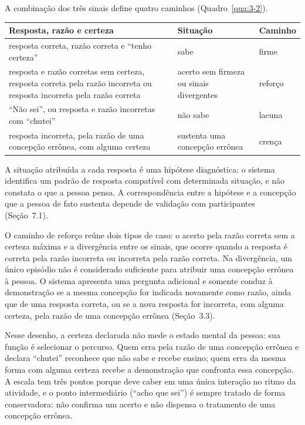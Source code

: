 A combinação dos três sinais define quatro caminhos (Quadro~\ref{qua:3-2}).

\begin{quadro}[htbp]
\caption{Classificação da resposta e caminho correspondente}\label{qua:3-2}
\footnotesize
\begin{tabularx}{\textwidth}{|X|X|>{\centering\arraybackslash}p{1.9cm}|}
\hline
\textbf{Resposta, razão e certeza} & \textbf{Situação} & \textbf{Caminho} \\ \hline
resposta correta, razão correta e ``tenho certeza'' & sabe & firme \\ \hline
resposta e razão corretas sem certeza, resposta correta pela razão incorreta ou resposta incorreta pela razão correta & acerto sem firmeza ou sinais divergentes & reforço \\ \hline
``Não sei'', ou resposta e razão incorretas com ``chutei'' & não sabe & lacuna \\ \hline
resposta incorreta, pela razão de uma concepção errônea, com alguma certeza & sustenta uma concepção errônea & crença \\ \hline
\end{tabularx}
\end{quadro}

A situação atribuída a cada resposta é uma hipótese diagnóstica: o sistema identifica um padrão de resposta compatível com determinada situação, e não constata o que a pessoa pensa. A correspondência entre a hipótese e a concepção que a pessoa de fato sustenta depende de validação com participantes (Seção~7.1).

O caminho de reforço reúne dois tipos de caso: o acerto pela razão correta sem a certeza máxima e a divergência entre os sinais, que ocorre quando a resposta é correta pela razão incorreta ou incorreta pela razão correta. Na divergência, um único episódio não é considerado suficiente para atribuir uma concepção errônea à pessoa. O sistema apresenta uma pergunta adicional e somente conduz à demonstração se a mesma concepção for indicada novamente como razão, ainda que de uma resposta correta, ou se a nova resposta for incorreta, com alguma certeza, pela razão de uma concepção errônea (Seção~3.3).

Nesse desenho, a certeza declarada não mede o estado mental da pessoa: sua função é selecionar o percurso. Quem erra pela razão de uma concepção errônea e declara ``chutei'' reconhece que não sabe e recebe ensino; quem erra da mesma forma com alguma certeza recebe a demonstração que confronta essa concepção. A escala tem três pontos porque deve caber em uma única interação no ritmo da atividade, e o ponto intermediário (``acho que sei'') é sempre tratado de forma conservadora: não confirma um acerto e não dispensa o tratamento de uma concepção errônea.

